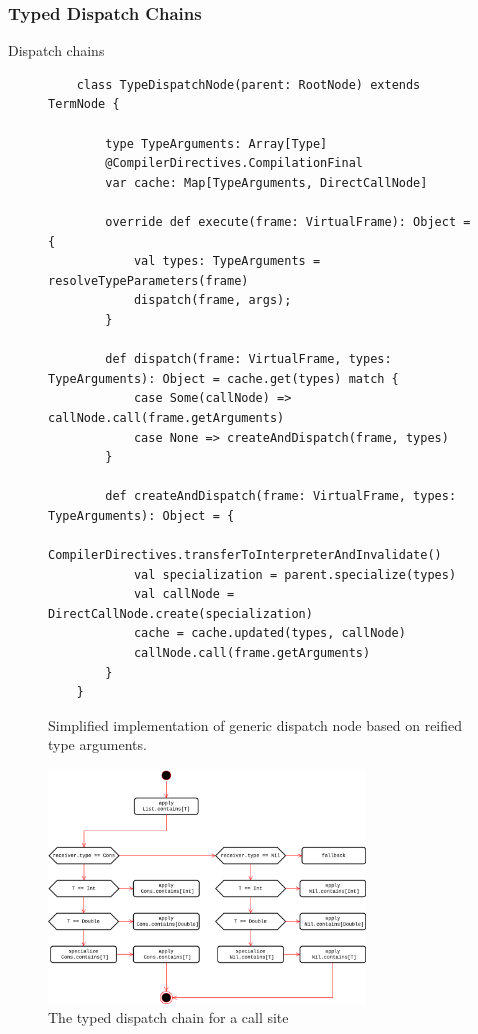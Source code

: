 \subsubsection*{Typed Dispatch Chains}

Dispatch chains\cite{???}

\begin{figure}[H]
	\begin{verbatim}
	class TypeDispatchNode(parent: RootNode) extends TermNode {
		
		type TypeArguments: Array[Type]
		@CompilerDirectives.CompilationFinal
		var cache: Map[TypeArguments, DirectCallNode]
		
		override def execute(frame: VirtualFrame): Object = {
			val types: TypeArguments = resolveTypeParameters(frame)
			dispatch(frame, args);
		}
		
		def dispatch(frame: VirtualFrame, types: TypeArguments): Object = cache.get(types) match {
			case Some(callNode) => callNode.call(frame.getArguments)
			case None => createAndDispatch(frame, types)
		}
		
		def createAndDispatch(frame: VirtualFrame, types: TypeArguments): Object = {
			CompilerDirectives.transferToInterpreterAndInvalidate()
			val specialization = parent.specialize(types)
			val callNode = DirectCallNode.create(specialization)
			cache = cache.updated(types, callNode)
			callNode.call(frame.getArguments)
		}
	}
	\end{verbatim}
\caption{Simplified implementation of generic dispatch node based on reified type arguments.}
\end{figure}

\begin{figure}[H]
	\centering
	\includegraphics[width=0.75\textwidth]{figures/tastytruffle-type-dispatch-chain.png}
	\caption{The typed dispatch chain for a  call site }
\end{figure}

